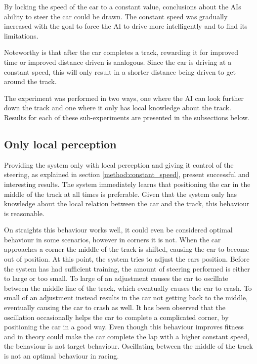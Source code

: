 By locking the speed of the car to a constant value, conclusions about the AIs ability to steer the car could be drawn. The constant speed was gradually increased with the goal to force the AI to drive more intelligently and to find its limitations. 

Noteworthy is that after the car completes a track, rewarding it for improved time or improved distance driven is analogous. Since the car is driving at a constant speed, this will only result in a shorter distance being driven to get around the track.

The experiment was performed in two ways, one where the AI can look further down the track and one where it only has local knowledge about the track. Results for each of these sub-experiments are presented in the subsections below.

\subsection{Only local perception}
Providing the system only with local perception and giving it control of the steering, as explained in section \ref{method:constant_speed}, present successful and interesting results. The system immediately learns that positioning the car in the middle of the track at all times is preferable. Given that the system only has knowledge about the local relation between the car and the track, this behaviour is reasonable.

On straights this behaviour works well, it could even be considered optimal behaviour in some scenarios, however in corners it is not. When the car approaches a corner the middle of the track is shifted, causing the car to become out of position. At this point, the system tries to adjust the cars position. Before the system has had sufficient training, the amount of steering performed is either to large or too small. To large of an adjustment causes the car to oscillate between the middle line of the track, which eventually causes the car to crash. To small of an adjustment instead results in the car not getting back to the middle, eventually causing the car to crash as well. It has been observed that the oscillation occasionally helps the car to complete a complicated corner, by positioning the car in a good way. Even though this behaviour improves fitness and in theory could make the car complete the lap with a higher constant speed, the behaviour is not target behaviour. Oscillating between the middle of the track is not an optimal behaviour in racing.


